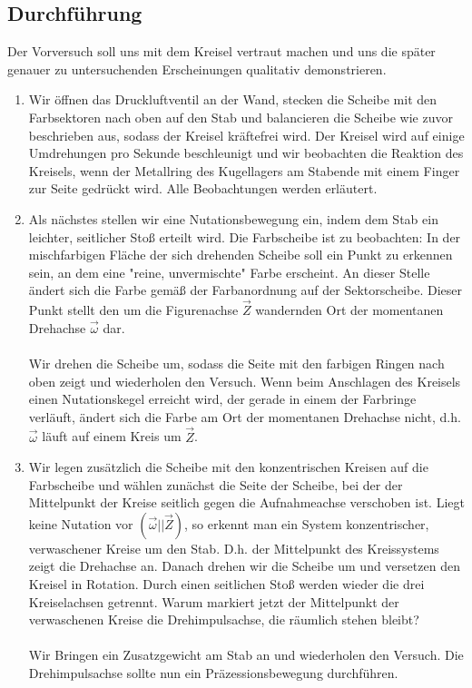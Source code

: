 \documentclass[a4paper,10pt]{article}
\begin{document}
\subsection[Durchführung]{Durchführung\fnrefb}
Der Vorversuch soll uns mit dem Kreisel vertraut machen und uns die später genauer zu untersuchenden Erscheinungen qualitativ demonstrieren.
\begin{enumerate}[label=(\alph*)]
\item Wir öffnen das Druckluftventil an der Wand, stecken die Scheibe mit den Farbsektoren nach oben auf den Stab und balancieren die Scheibe wie zuvor beschrieben aus, sodass der Kreisel kräftefrei wird. Der Kreisel wird auf einige Umdrehungen pro Sekunde beschleunigt und wir beobachten die
Reaktion des Kreisels, wenn der Metallring des Kugellagers am Stabende mit einem Finger zur Seite gedrückt wird. Alle Beobachtungen werden erläutert.

\item Als nächstes stellen wir eine Nutationsbewegung ein, indem dem Stab ein leichter, seitlicher Stoß erteilt wird. Die Farbscheibe ist zu beobachten: In der mischfarbigen Fläche der sich drehenden Scheibe soll ein Punkt zu erkennen sein, an dem eine "reine, unvermischte" Farbe erscheint. An dieser Stelle ändert
sich die Farbe gemäß der Farbanordnung auf der Sektorscheibe. Dieser Punkt stellt den um die Figurenachse \(\vec{Z}\) wandernden Ort der momentanen Drehachse \(\vec{\omega}\) dar.\\\\
Wir drehen die Scheibe um, sodass die Seite mit den farbigen Ringen nach oben zeigt und wiederholen den Versuch. Wenn beim Anschlagen des Kreisels einen Nutationskegel erreicht wird, der gerade in einem der Farbringe
verläuft, ändert sich die Farbe am Ort der momentanen Drehachse nicht, d.h.
\(\vec{\omega}\) läuft auf einem Kreis um \(\vec{Z}\).

\item Wir legen zusätzlich die Scheibe mit den konzentrischen Kreisen auf die Farbscheibe und wählen zunächst die Seite der Scheibe, bei der der Mittelpunkt der Kreise seitlich gegen die Aufnahmeachse verschoben ist. Liegt keine Nutation vor \( ({\vec{\omega} || \vec{Z}}) \), so erkennt man ein System konzentrischer, verwaschener Kreise um den Stab. D.h. der Mittelpunkt des Kreissystems zeigt die Drehachse an. Danach drehen wir die Scheibe um und versetzen  den Kreisel in Rotation. Durch einen seitlichen Stoß werden wieder die drei Kreiselachsen getrennt. Warum markiert jetzt der Mittelpunkt der verwaschenen Kreise die Drehimpulsachse, die räumlich stehen bleibt?\\\\
Wir Bringen ein Zusatzgewicht am Stab an und wiederholen den Versuch. Die Drehimpulsachse sollte nun ein Präzessionsbewegung durchführen.


\end{enumerate}
\end{document}
